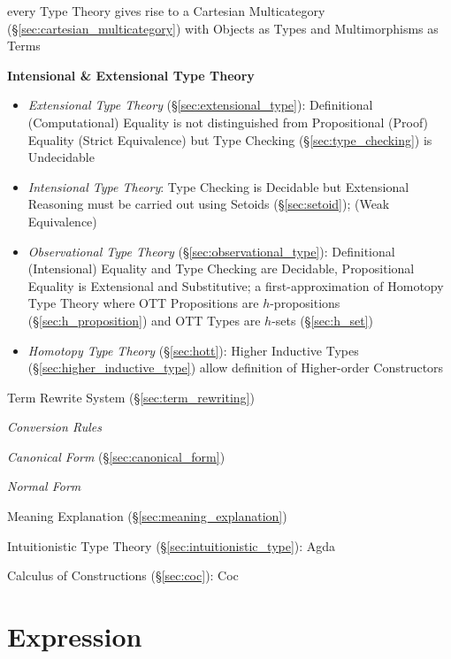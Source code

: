 every Type Theory gives rise to a Cartesian Multicategory
(\S\ref{sec:cartesian_multicategory}) with Objects as Types and
Multimorphisms as Terms



\textbf{Intensional \& Extensional Type Theory}

\begin{itemize}
\item \emph{Extensional Type Theory} (\S\ref{sec:extensional_type}):
  Definitional (Computational) Equality is not distinguished from
  Propositional (Proof) Equality (Strict Equivalence) but Type Checking
  (\S\ref{sec:type_checking}) is Undecidable

\item \emph{Intensional Type Theory}: Type Checking is Decidable but
  Extensional Reasoning must be carried out using Setoids
  (\S\ref{sec:setoid}); (Weak Equivalence)

\item \emph{Observational Type Theory}
  (\S\ref{sec:observational_type}): Definitional (Intensional)
  Equality and Type Checking are Decidable, Propositional Equality is
  Extensional and Substitutive; a first-approximation of Homotopy Type
  Theory where OTT Propositions are $h$-propositions
  (\S\ref{sec:h_proposition}) and OTT Types are $h$-sets
  (\S\ref{sec:h_set})

\item \emph{Homotopy Type Theory} (\S\ref{sec:hott}):
  Higher Inductive Types (\S\ref{sec:higher_inductive_type}) allow
  definition of Higher-order Constructors
\end{itemize}

Term Rewrite System (\S\ref{sec:term_rewriting})

\emph{Conversion Rules}

\emph{Canonical Form} (\S\ref{sec:canonical_form})

\emph{Normal Form}


Meaning Explanation (\S\ref{sec:meaning_explanation})


\asterism


Intuitionistic Type Theory (\S\ref{sec:intuitionistic_type}): Agda

Calculus of Constructions (\S\ref{sec:coc}): Coc



\section{Expression}\label{sec:type_expression}

